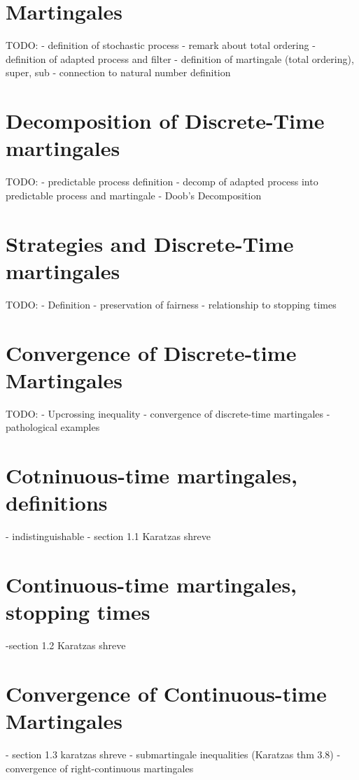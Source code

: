 \section{Martingales}
\label{stoch:martingales}

TODO:
- definition of stochastic process
- remark about total ordering
- definition of adapted process and filter
- definition of martingale (total ordering), super, sub
- connection to natural number definition

\section{Decomposition of Discrete-Time martingales}

TODO: 
- predictable process definition
- decomp of adapted process into predictable process and martingale
- Doob's Decomposition

\section{Strategies and Discrete-Time martingales}
TODO:
- Definition
- preservation of fairness
- relationship to stopping times

\section{Convergence of Discrete-time Martingales}

TODO:
- Upcrossing inequality
- convergence of discrete-time martingales
- pathological examples

\section{Cotninuous-time martingales, definitions}
- indistinguishable
- section 1.1 Karatzas shreve

\section{Continuous-time martingales, stopping times}
-section 1.2 Karatzas shreve

\section{Convergence of Continuous-time Martingales}
- section 1.3 karatzas shreve
- submartingale inequalities (Karatzas thm 3.8)
- convergence of right-continuous martingales